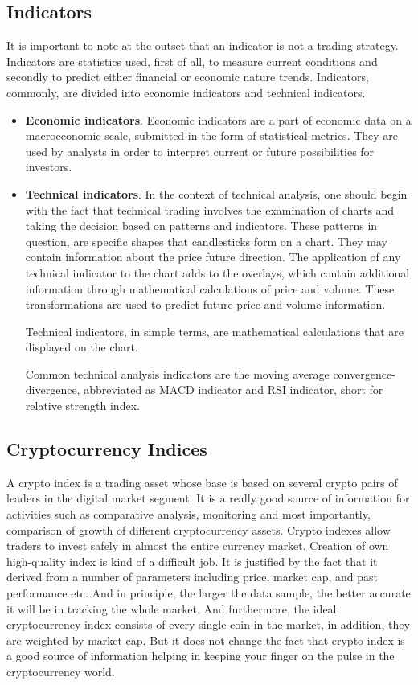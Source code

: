 \documentclass[thesis=B,english]{FITthesis}[2019/03/06]
\begin{document}
\subsection{Indicators}
It is important to note at the outset that an indicator is not a trading strategy. Indicators are statistics used, first of all, to measure current conditions and secondly to predict either financial or economic nature trends. 
Indicators, commonly, are divided into economic indicators and technical indicators.
\begin{itemize}
\item 
\textbf{Economic indicators}. Economic indicators are a part of economic data on a macroeconomic scale, submitted in the form of statistical metrics. They are used by analysts in order to interpret current or future possibilities for investors.

\item 
\textbf{Technical indicators}. In the context of technical analysis, one should begin with the fact that technical trading involves the examination of charts and taking the decision based on patterns and indicators.
These patterns in question, are specific shapes that candlesticks form on a chart. They may contain information about the price future direction. The application of any technical indicator to the chart adds to the overlays, which contain additional information through mathematical calculations of price and volume. These transformations are used to predict future price and volume information.

Technical indicators, in simple terms, are mathematical calculations that are displayed on the chart.

Common technical analysis indicators are the moving average convergence-divergence, abbreviated as MACD indicator and RSI indicator, short for relative strength index.
\end{itemize}

\subsection{Cryptocurrency Indices}
A crypto index is a trading asset whose base is based on several crypto pairs of leaders in the digital market segment. It is a really good source of information for activities such as comparative analysis, monitoring and most importantly, comparison of growth of different cryptocurrency assets. Crypto indexes allow traders to invest safely in almost the entire currency market.
Creation of own high-quality index is kind of a difficult job. It is justified by the fact that it derived from a number of parameters including price, market cap, and past performance etc. And in principle, the larger the data sample, the better accurate it will be in tracking the whole market.  And furthermore, the ideal cryptocurrency index consists of every single coin in the market, in addition, they are weighted by market cap. But it does not change the fact that crypto index is a good source of information helping in keeping your finger on the pulse in the cryptocurrency world.
\end{document}
